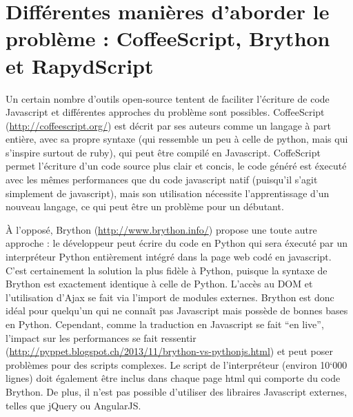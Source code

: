 \documentclass[a4,10pt,french]{sphinxmanual}
\begin{document}
\section{Différentes manières d'aborder le problème : CoffeeScript, Brython et RapydScript}
\label{rapydscript:differentes-manieres-d-aborder-le-probleme-coffeescript-brython-et-rapydscript}
Un certain nombre d'outils open-source tentent de faciliter l'écriture de code Javascript et différentes approches du problème sont possibles. CoffeeScript (\href{http://coffeescript.org/}{http://coffeescript.org/}) est décrit par ses auteurs comme un langage à part entière, avec sa propre syntaxe (qui ressemble un peu à celle de python, mais qui s'inspire surtout de ruby), qui peut être compilé en Javascript. CoffeScript permet l'écriture d'un code source plus clair et concis, le code généré est éxecuté avec les mêmes performances que du code javascript natif (puisqu'il s'agit simplement de javascript), mais son utilisation nécessite l'apprentissage d'un nouveau langage, ce qui peut être un problème pour un débutant.

À l'opposé, Brython (\href{http://www.brython.info/}{http://www.brython.info/}) propose une toute autre approche : le développeur peut écrire du code en Python qui sera éxecuté par un interpréteur Python entièrement intégré dans la page web codé en javascript. C'est certainement la solution la plus fidèle à Python, puisque la syntaxe de Brython est exactement identique à celle de Python. L'accès au DOM et l'utilisation d'Ajax se fait via l'import de modules externes. Brython est donc idéal pour quelqu'un qui ne connaît pas Javascript mais possède de bonnes bases en Python. Cependant, comme la traduction en Javascript se fait ``en live'', l'impact sur les performances se fait ressentir (\href{http://pyppet.blogspot.ch/2013/11/brython-vs-pythonjs.html}{http://pyppet.blogspot.ch/2013/11/brython-vs-pythonjs.html}) et peut poser problèmes pour des scripts complexes. Le script de l'interpréteur (environ 10`000 lignes) doit également être inclus dans chaque page html qui comporte du code Brython. De plus, il n'est pas possible d'utiliser des libraires Javascript externes, telles que jQuery ou AngularJS.
\end{document}

